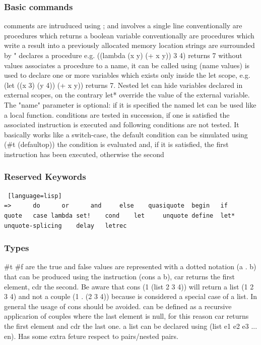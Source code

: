 \subsubsection{Basic commands}
\begin{itemize}
	\itembf{;} comments are intruduced using ; and involves a single line
	 conventionally are procedures which returns a boolean variable
	 conventionally are procedures which write a result into a previously allocated memory location
	 strings are surrounded by "
	 declares a procedure e.g. ((lambda (x y) (+ x y)) 3 4) returns 7 
	 without values associates a procedure to a name, it can be called using (name values)
	 is used to declare one or more variables which exists only inside the let scope, e.g. (let ((x 3) (y 4)) (+ x y)) returns 7. Nested let can hide variables declared in external scopes, on the contrary let* override the value of the external variable. The "name" parameter is optional: if it is specified the named let can be used like a local function.
	 conditions are tested in succession, if one is satisfied the associated instruction is executed and following conditions are not tested. It basically works like a switch-case, the default condition can be simulated using (\#t (defaultop))
	 the condition is evaluated and, if it is satisfied, the first instruction has been executed, otherwise the second
\end{itemize}

\subsubsection{Reserved Keywords}
\begin{lstlisting} [language=lisp]
=>		do		or		and		else	quasiquote	begin	if		quote	case lambda	set!	cond	let		unquote	define	let*	unquote-splicing	delay	letrec
\end{lstlisting}

\subsubsection{Types}
	\begin{itemize}
		 \#t \#f are the true and false values
		 are represented with a dotted notation (a . b) that can be produced using the instruction (cons a b), car returns the first element, cdr the second. Be aware that cons (1 (list 2 3 4)) will return a list (1 2 3 4) and not a couple (1 . (2 3 4)) because is considered a special case of a list. In general the usage of cons should be avoided.
		 can be defined as a recursive applicarion of couples where the last element is null, for this reason car returns the first element and cdr the last one. a list can be declared using (list e1 e2 e3 ... en). Has some extra feture respect to pairs/nested pairs.
	\end{itemize}
	
